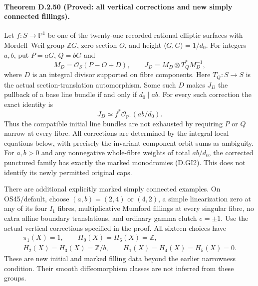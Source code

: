 \paragraph{Theorem D.2.50 (Proved: all vertical corrections and new simply connected fillings).}
Let $f:S\to\mathbb P^1$ be one of the twenty-one recorded
rational elliptic surfaces with Mordell--Weil group $\mathbb ZG$,
zero section $O$, and height $\langle G,G\rangle=1/d_0$.
For integers $a,b$, put $P=aG$, $Q=bG$ and
\[
 M_D=\mathcal O_S(P-O+D),\qquad
 J_D=M_D\otimes T_Q^*M_D^{-1},
\]
where $D$ is an integral divisor supported on fibre components.
Here $T_Q:S\to S$ is the actual section-translation automorphism.
Some such $D$ makes
$J_D$ the pullback of a base line bundle if and only if
$d_0\mid ab$. For every such correction the exact identity is
\[
                  J_D\simeq f^*\mathcal O_{\mathbb P^1}(ab/d_0).
                                                        \tag{D.VC1}
\]
Thus the compatible initial line bundles are not exhausted
by requiring $P$ or $Q$ narrow at every fibre.
All corrections are determined by the integral local equations
below, with precisely the invariant component orbit sums as ambiguity.
For $a,b>0$ and any nonnegative whole-fibre weights of total $ab/d_0$,
the corrected punctured family has exactly the marked monodromies
(D.GI2). This does not identify its newly permitted original caps.

There are additional explicitly marked simply connected examples.
On OS45/default, choose $(a,b)=(2,4)$ or $(4,2)$, a simple
linearization zero at any of its four $I_1$ fibres, multiplicative
Mumford fillings at every singular fibre, no extra affine boundary
translations, and ordinary gamma clutch $e=\pm1$. Use the actual
vertical corrections specified in the proof. All sixteen choices have
\[
 \begin{gathered}
 \pi_1(X)=1,\qquad H_0(X)=H_6(X)=\mathbb Z,\\
 H_2(X)=H_3(X)=\mathbb Z/b,\qquad
 H_1(X)=H_4(X)=H_5(X)=0 .
 \end{gathered}                                             \tag{D.VC7}
\]
These are new initial and marked filling data beyond the earlier
narrowness condition. Their smooth diffeomorphism classes are not
inferred from these groups.

